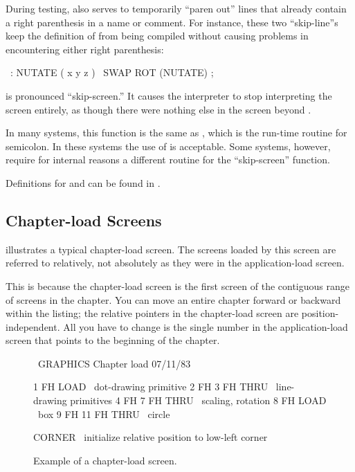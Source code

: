 During testing, \forth{\bs} also serves to temporarily ``paren out''
lines that already contain a right parenthesis in a name or comment.
For instance, these two ``skip-line''s keep the definition of
 from being compiled without causing problems in
encountering either right parenthesis:
\begin{Code}
\ : NUTATE  ( x y z )
\   SWAP ROT  (NUTATE) ;
\end{Code}
 is pronounced ``skip-screen.'' It causes the \Forth{}
interpreter to stop interpreting the screen entirely, as though there
were nothing else in the screen beyond .

In many \Forth{} systems, this function is the same as ,
which is the run-time routine for semicolon.  In these systems the use
of  is acceptable.  Some \Forth{} systems, however,
require for internal reasons a different routine for the
``skip-screen'' function.

Definitions for \forth{\bs} and  can be found in .

\subsection{Chapter-load Screens}

 illustrates a typical chapter-load screen.  The screens
loaded by this screen are referred to relatively, not absolutely as
they were in the application-load screen.

This is because the chapter-load screen is the first screen of the
contiguous range of screens in the chapter.  You can move an entire
chapter forward or backward within the listing; the relative pointers
in the chapter-load screen are position-independent.  All you have to
change is the single number in the application-load screen that points
to the beginning of the chapter.

\begin{figure*}
\caption{Example of a chapter-load screen.}

\setcounter{screen}{100}
\begin{Screen}
\ GRAPHICS                 Chapter load                 07/11/83

 1 FH LOAD            \ dot-drawing primitive
 2 FH 3 FH THRU       \ line-drawing primitives
 4 FH 7 FH THRU       \ scaling, rotation
 8 FH LOAD            \ box
 9 FH 11 FH THRU      \ circle



CORNER  \ initialize relative position to low-left corner





\end{Screen}
\end{figure*}


